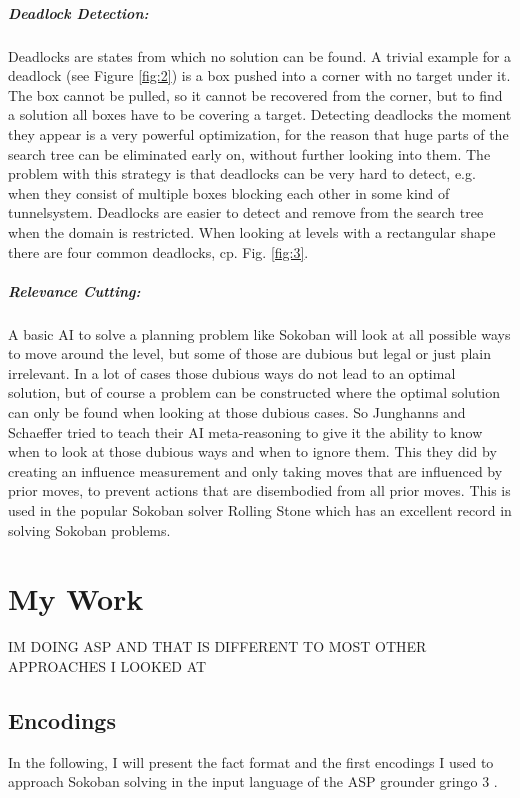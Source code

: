 \documentclass{report}
\begin{document}
\paragraph{Deadlock Detection:} Deadlocks are states from which no solution can be found. A trivial example for a deadlock (see Figure \ref{fig:2}) is a box pushed into a corner with no target under it. The box cannot be pulled, so it cannot be recovered from the corner, but to find a solution all boxes have to be covering a target.
Detecting deadlocks the moment they appear is a very powerful optimization, for the reason that huge parts of the search tree can be eliminated early on, without further looking into them. The problem with this strategy is that deadlocks can be very hard to detect, e.g. when they consist of multiple boxes blocking each other in some kind of tunnelsystem. Deadlocks are easier to detect and remove from the search tree when the domain is restricted. When looking at levels with a rectangular shape there are four common deadlocks, cp. Fig. \ref{fig:3}.
\paragraph{Relevance Cutting:} A basic AI to solve a planning problem like Sokoban will look at all possible ways to move around the level, but some of those are dubious but legal or just plain irrelevant. In a lot of cases those dubious ways do not lead to an optimal solution, but of course a problem can be constructed where the optimal solution can only be found when looking at those dubious cases. So Junghanns and Schaeffer tried to teach their AI meta-reasoning to give it the ability to know when to look at those dubious ways and when to ignore them. This they did by creating an influence measurement and only taking moves that are influenced by prior moves, to prevent actions that are disembodied from all prior moves. This is used in the popular Sokoban solver Rolling Stone which has an excellent record in solving Sokoban problems.
\chapter{My Work}
IM DOING ASP AND THAT IS DIFFERENT TO MOST OTHER APPROACHES I LOOKED AT
\cite{BoteaHeuristicsVsPlanning} \cite{Dor1999SOKOBANAO} \cite{Froleyks2017UsingAA} \cite{SokoRelevanceCuts}
\section{Encodings}
In the following, I will present the fact format and the first encodings I used to approach Sokoban solving in the input language of the ASP grounder gringo 3 \cite{Potassco}.
\end{document}
